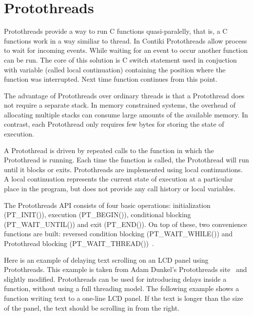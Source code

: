 
\section{Protothreads}\label{sec:contiki-protothreads}
Protothreads provide a way to run C functions quasi-paralelly, that is, a C functions work in a way similiar to thread.
In Contiki Protothreads allow process to wait for incoming events. While waiting for an event to occur another function
can be run. The core of this solution is C switch statement used in conjuction with variable (called local continuation)
containing the position where the function was interrupted. Next time function continues from this point.

The advantage of Protothreads over ordinary threads is that a Protothread does not require a separate stack.
In memory constrained systems, the overhead of allocating multiple stacks can consume large amounts of
the available memory. In contrast, each Protothread only requires few bytes for storing the state of execution.

A Protothread is driven by repeated calls to the function in which the Protothread is running.
Each time the
function is called, the Protothread will run until it blocks or exits.
Protothreads are implemented using local continuations. A local continuation represents the current state
of execution at a particular place in the program, but does not provide any call history or local variables.

The Protothreads API consists of four basic operations: initialization (PT\_INIT()), execution (PT\_BEGIN()),
conditional blocking (PT\_WAIT\_UNTIL()) and exit (PT\_END()). On top of these, two convenience functions
are built: reversed condition blocking (PT\_WAIT\_WHILE()) and Protothread blocking (PT\_WAIT\_THREAD())~\cite{paper-protothreads}.

\!
Here is an example of delaying text scrolling on an LCD panel using Protothreads. This example is taken from
Adam Dunkel's Protothreads site~\cite{adam-protothreads} and slightly modified.
Protothreads can be used for introducing delays inside a function, without using a full threading model.
The following example shows a function writing text to a one-line LCD panel.
If the text is longer than the size of the panel, the text should be scrolling in from the right. 

